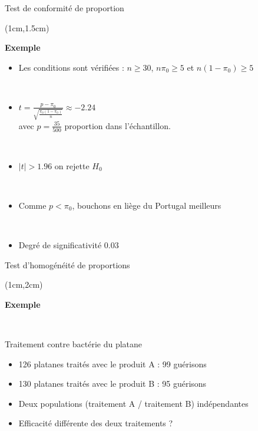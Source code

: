 \documentclass{beamer}
\begin{document}
\begin{frame}{Test de conformité de proportion}
\begin{textblock*}{\textwidth}(1cm,1.5cm)

\begin{center}{\bf \Large Exemple  } \end{center}
 
 
\begin{itemize}
\item Les conditions sont vérifiées :  $n\geq 30$, $n\pi_0\geq 5$ et $n(1-\pi_0)\geq 5$

\
\item $t=\frac{p-\pi_0}{\sqrt{\frac{\pi_0(1-\pi_0)}{n}}} \approx -2.24
$
\\
avec  $p=\frac{35}{500}$ proportion dans l'échantillon.

\
\item  $|t|>1.96$ on rejette  $H_0$

\
\item Comme $p<\pi_0$,  bouchons en liège 
du Portugal meilleurs

\
\item Degré de significativité 0.03
\end{itemize}

\end{textblock*}

\end{frame}
 

\begin{frame}{Test d'homogénéité de proportions}
\begin{textblock*}{\textwidth}(1cm,2cm)

\begin{center}{\bf \Large Exemple  } \end{center}



 \
 
 Traitement contre bactérie du platane

\begin{itemize}
\item 126 platanes traités avec le produit A  : 99 guérisons
\item 130 platanes traités avec le produit B : 95 guérisons
\item Deux populations (traitement A / traitement B) indépendantes
\item Efficacité différente des deux traitements ?
\end{itemize}

\end{textblock*}

\end{frame}
\end{document}
